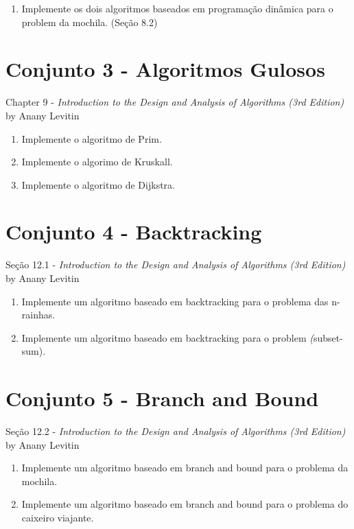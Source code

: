 \documentclass{article}
\begin{document}
\begin{enumerate}
    \item Implemente os dois algoritmos baseados em programação dinâmica para o problem da mochila. (Seção 8.2)
\end{enumerate}

\section{Conjunto 3 - Algoritmos Gulosos}
Chapter 9 - \textit{Introduction to the Design and Analysis of Algorithms (3rd Edition)} by Anany Levitin

\begin{enumerate}
    \item Implemente o algoritmo de Prim.
    \item Implemente o algorimo de Kruskall.
    \item Implemente o algoritmo de Dijkstra.
\end{enumerate}

\section{Conjunto 4 - Backtracking}
Seção 12.1 - \textit{Introduction to the Design and Analysis of Algorithms (3rd Edition)} by Anany Levitin

\begin{enumerate}
    \item Implemente um algoritmo baseado em backtracking para o problema das n-rainhas.
    \item Implemente um algoritmo baseado em backtracking para o problem \textit(subset-sum).
\end{enumerate}

\section{Conjunto 5 - Branch and Bound}
Seção 12.2 - \textit{Introduction to the Design and Analysis of Algorithms (3rd Edition)} by Anany Levitin

\begin{enumerate}
    \item Implemente um algoritmo baseado em branch and bound para o problema da mochila.
    \item Implemente um algoritmo baseado em branch and bound para o problema do caixeiro viajante.  
\end{enumerate}


%
%
\end{document}
